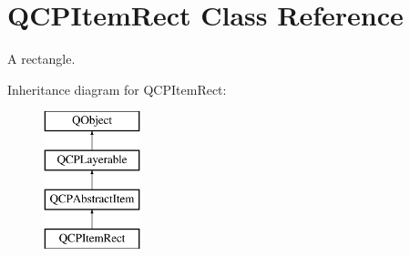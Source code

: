\hypertarget{classQCPItemRect}{}\section{Q\+C\+P\+Item\+Rect Class Reference}
\label{classQCPItemRect}


A rectangle.  


Inheritance diagram for Q\+C\+P\+Item\+Rect\+:\begin{figure}[H]
\begin{center}
\leavevmode
\includegraphics[height=4.000000cm]{classQCPItemRect}
\end{center}
\end{figure}
